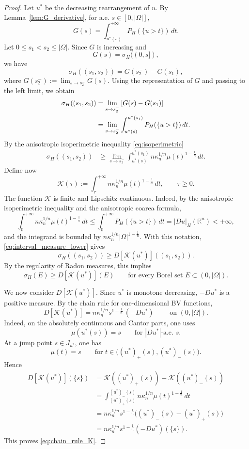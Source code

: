 \documentclass[oneside,a4paper,12pt,notitlepage]{article}
\theoremstyle{definition}
\begin{document}
\begin{proof}
Let $u^*$ be the decreasing rearrangement of $u$. By Lemma~\ref{lem:G_derivative}, for a.e.
$s\in[0,|\Omega|]$,
\[
G(s)=\int_{u^*(s)}^{+\infty} P_H(\{u>t\})\,dt .
\]
 Let
$0\le s_1<s_2\le |\Omega|$. Since \(G\) is increasing and
\[
G(s)=\sigma_H((0,s]),
\]
we have
\[
\sigma_H((s_1,s_2))
=
G(s_2^-)-G(s_1),
\]
where \(G(s_2^-):=\lim_{s\to s_2^-}G(s)\). Using the representation of \(G\)
and passing to the left limit, we obtain
\begin{align}
\sigma_H((s_1,s_2))
&=
\lim_{s\to s_2^-}
\left[
G(s)-G(s_1)
\right] \notag\\
&=
\lim_{s\to s_2^-}
\int_{u^*(s)}^{u^*(s_1)} P_H(\{u>t\})\,dt . \label{eq:sigma_interval_left}
\end{align}
By the anisotropic isoperimetric inequality \eqref{eq:isoperimetric}
\begin{align}
\sigma_H((s_1,s_2))
&\ge
\lim_{s\to s_2^-}
\int_{u^*(s)}^{u^*(s_1)}
n\kappa_n^{1/n}\mu(t)^{1-\frac1n}\,dt .
\label{eq:interval_measure_lower}
\end{align}
Define now 
\[
\mathcal K(\tau):=
\int_\tau^{+\infty}
n\kappa_n^{1/n}\mu(t)^{1-\frac1n}\,dt,
\qquad \tau\ge 0.
\]
The function \(\mathcal K\) is finite and Lipschitz continuous. Indeed, by the
anisotropic isoperimetric inequality and the anisotropic coarea formula,
\[
\int_0^{+\infty}
n\kappa_n^{1/n}\mu(t)^{1-\frac1n}\,dt
\le
\int_0^{+\infty} P_H(\{u>t\})\,dt
=
|Du|_H(\mathbb R^n)<+\infty,
\]
and the integrand is bounded by
\(n\kappa_n^{1/n}|\Omega|^{1-\frac1n}\).
With this notation, \eqref{eq:interval_measure_lower} gives
\[
\sigma_H((s_1,s_2))
\ge
D[\mathcal K(u^*)]((s_1,s_2)).
\]
By the regularity of Radon measures, this implies
\begin{equation}\label{eq:measure_domination}
\sigma_H(E)\ge D[\mathcal K(u^*)](E)
\qquad
\text{for every Borel set }E\subset(0,|\Omega|).
\end{equation}

We now consider \(D[\mathcal K(u^*)]\). Since \(u^*\) is monotone decreasing,
\(-Du^*\) is a positive measure. By the chain rule for one-dimensional BV
functions,
\begin{equation}\label{eq:chain_rule_K}
D[\mathcal K(u^*)]
=
n\kappa_n^{1/n}s^{1-\frac1n}\,(-Du^*)
\qquad\text{ on }(0,|\Omega|).
\end{equation}
 Indeed, on the
absolutely continuous and Cantor parts, one uses
\[
\mu(u^*(s))=s
\qquad\text{for }|Du^*|\text{-a.e. }s.
\]
At a jump point \(s\in J_{u^*}\), one has
\[
\mu(t)=s
\qquad
\text{for }t\in\big((u^*)_+(s),(u^*)_-(s)\big).
\]
Hence
\begin{align*}
D[\mathcal K(u^*)](\{s\})
&=
\mathcal K((u^*)_+(s))-\mathcal K((u^*)_-(s))\\
&=
\int_{(u^*)_+(s)}^{(u^*)_-(s)}
n\kappa_n^{1/n}\mu(t)^{1-\frac1n}\,dt\\
&=
n\kappa_n^{1/n}s^{1-\frac1n}
\big((u^*)_-(s)-(u^*)_+(s)\big)\\
&=
n\kappa_n^{1/n}s^{1-\frac1n}(-Du^*)(\{s\}).
\end{align*}
This proves \eqref{eq:chain_rule_K}.


\end{proof}
\end{document}
